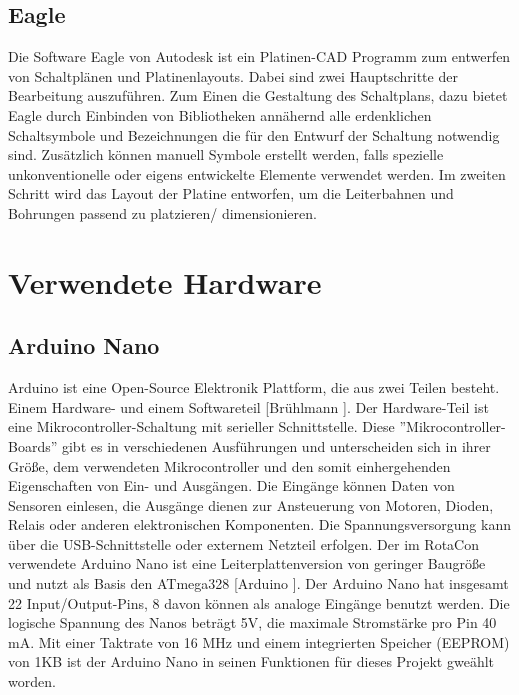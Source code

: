\documentclass[11pt, titlepage, fleqn]{report}
\begin{document}
			\subsection*{Eagle}
			\label{sec:Eagle}
				Die Software Eagle von Autodesk ist ein Platinen-CAD Programm zum entwerfen von Schaltplänen und Platinenlayouts. Dabei sind zwei Hauptschritte der Bearbeitung auszuführen. Zum Einen die Gestaltung des Schaltplans, dazu bietet Eagle durch Einbinden von Bibliotheken annähernd alle erdenklichen 
				Schaltsymbole und Bezeichnungen die für den Entwurf der Schaltung notwendig sind. Zusätzlich können manuell Symbole erstellt werden, falls spezielle unkonventionelle oder eigens entwickelte Elemente verwendet werden.
				Im zweiten Schritt wird das Layout der Platine entworfen, um die Leiterbahnen und Bohrungen passend zu platzieren/ dimensionieren.
		\section{Verwendete Hardware}
				\subsection*{Arduino Nano}
				\label{sec:Nano}
					Arduino ist eine Open-Source Elektronik Plattform, die aus zwei Teilen besteht. Einem Hardware- und einem Softwareteil [Brühlmann \cite[S.23]{Arduino_Plattform}]. Der Hardware-Teil ist eine Mikrocontroller-Schaltung mit serieller Schnittstelle. Diese ''Mikrocontroller-Boards'' gibt es in verschiedenen Ausführungen und unterscheiden sich in ihrer Größe, dem verwendeten Mikrocontroller und den somit einhergehenden Eigenschaften von Ein- und Ausgängen. Die Eingänge können Daten von Sensoren einlesen, die Ausgänge dienen zur Ansteuerung von Motoren, Dioden,	Relais oder anderen elektronischen Komponenten. Die Spannungsversorgung kann über die USB-Schnittstelle oder externem Netzteil erfolgen. Der im RotaCon verwendete Arduino Nano ist eine Leiterplattenversion von geringer Baugröße und nutzt als Basis den ATmega328 [Arduino \cite{Nano}]. Der Arduino Nano hat insgesamt 22 Input/Output-Pins, 8 davon können als analoge Eingänge benutzt werden. Die logische Spannung des Nanos beträgt 5V, die maximale Stromstärke pro Pin 40 mA. Mit einer Taktrate von 16 MHz und einem integrierten Speicher (EEPROM) von 1KB ist der Arduino Nano in seinen Funktionen für dieses Projekt gweählt worden.
			\newpage
\end{document}
